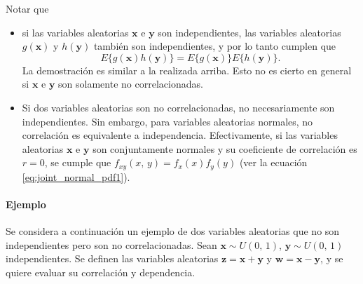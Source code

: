 \documentclass[a4paper]{report}
\newcommand{\x}{\mathbf{x}}
\newcommand{\y}{\mathbf{y}}
\newcommand{\w}{\mathbf{w}}
\newcommand{\z}{\mathbf{z}}
\begin{document}
Notar que
\begin{itemize}
 \item si las variables aleatorias \(\x\) e \(\y\) son independientes, las variables aleatorias \(g(\x)\) y \(h(\y)\) también son independientes, y por lo tanto cumplen que
 \begin{equation}\label{eq:independent_rv_mean_functions_product}
  E\{g(\x)h(\y)\}=E\{g(\x)\}E\{h(\y)\}.
 \end{equation}
 La demostración es similar a la realizada arriba. Esto no es cierto en general si \(\x\) e \(\y\) son solamente no correlacionadas.
 \item Si dos variables aleatorias son no correlacionadas, no necesariamente son independientes. Sin embargo, para variables aleatorias normales, no correlación es equivalente a independencia. Efectivamente, si las variables aleatorias \(\x\) e \(\y\) son conjuntamente normales y su coeficiente de correlación es \(r=0\), se cumple que \(f_{xy}(x,\,y)=f_x(x)f_y(y)\) (ver la ecuación \ref{eq:joint_normal_pdf1}).
\end{itemize}

\paragraph{Ejemplo} Se considera a continuación un ejemplo de dos variables aleatorias que no son independientes pero son no correlacionadas. Sean \(\x\sim U(0,\,1)\), \(\y\sim U(0,\,1)\) independientes. Se definen las variables aleatorias \(\z=\x+\y\) y \(\w=\x-\y\), y se quiere evaluar su correlación y dependencia.
\end{document}
